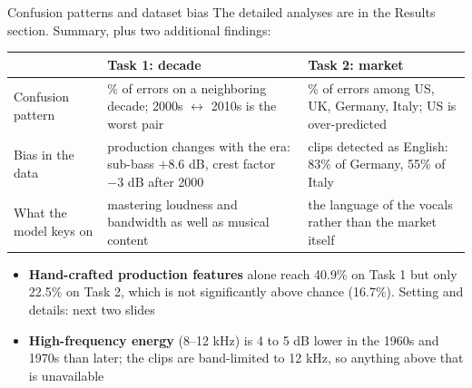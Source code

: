 \documentclass[aspectratio=169,11pt]{beamer}
\newenvironment{tight}{\begin{itemize}\setlength{\itemsep}{1.5pt}\setlength{\parskip}{0pt}\setlength{\topsep}{0pt}}{\end{itemize}}
\begin{document}
\begin{frame}[t]{Confusion patterns and dataset bias}
  \small
  The detailed analyses are in the Results section. Summary, plus two additional findings:
  \vspace{0.4em}

  {\footnotesize
  \begin{tabular}{@{}>{\raggedright\arraybackslash}p{}>{\raggedright\arraybackslash}p{}>{\raggedright\arraybackslash}p{}@{}}
    \toprule
    & \textbf{Task 1: decade} & \textbf{Task 2: market} \\ \midrule
    Confusion pattern & 57\% of errors on a neighboring decade; 2000s $\leftrightarrow$ 2010s is the worst pair & 68\% of errors among US, UK, Germany, Italy; US is over-predicted \\
    Bias in the data & production changes with the era: sub-bass $+8.6$ dB, crest factor $-3$ dB after 2000 & clips detected as English: 83\% of Germany, 55\% of Italy \\
    What the model keys on & mastering loudness and bandwidth as well as musical content & the language of the vocals rather than the market itself \\
    \bottomrule
  \end{tabular}}
  \vspace{0.6em}

  \begin{tight}\footnotesize
    \item \textbf{Hand-crafted production features} alone reach 40.9\% on Task 1 but only \alert{22.5\% on Task 2}, which is not significantly above chance (16.7\%). Setting and details: next two slides
    \item \textbf{High-frequency energy} (8--12 kHz) is 4 to 5 dB lower in the 1960s and 1970s than later; the clips are band-limited to 12 kHz, so anything above that is unavailable
  \end{tight}
\end{frame}
\end{document}
